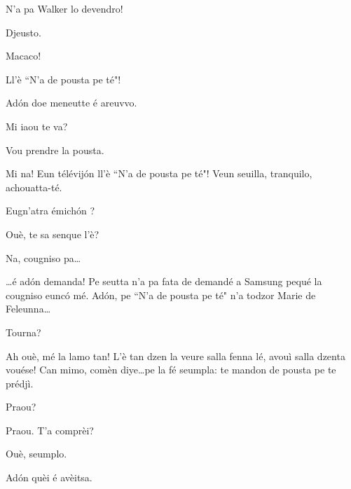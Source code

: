 \begin{drama}
\Vioujspeaks N'a pa Walker lo devendro!

\Vioupspeaks Djeusto.

\Vioujspeaks Macaco!

\Vioupspeaks Ll'è ``N'a de pousta pe té"!


\Vioujspeaks Ad\'on doe meneutte é areuvvo.

\Vioupspeaks Mi iaou te va?

\Vioujspeaks Vou prendre la pousta.

\Vioupspeaks Mi na! Eun télévij\'on ll'è ``N'a de pousta pe té"! Veun seuilla, tranquilo, achouatta-té.


\Vioujspeaks Eugn'atra émich\'on ?

\Vioupspeaks Ouè, te sa senque l'è?

\Vioujspeaks Na, cougniso pa\ldots

\Vioupspeaks \ldots é ad\'on demanda! Pe seutta n'a pa fata de demandé a Samsung pequé la cougniso eunc\'o mé. Ad\'on, pe ``N'a de pousta pe té" n'a todzor Marie de Feleunna\ldots

\Vioujspeaks Tourna?

\Vioupspeaks Ah ouè, mé la lamo tan! L'è tan dzen la veure salla fenna lé, avouì salla dzenta vouése! Can mimo, comèn diye\ldots pe la fé seumpla: te mandon de pousta pe te prédjì.

\Vioujspeaks Praou?

\Vioupspeaks Praou. T'a comprèi?

\Vioujspeaks Ouè, seumplo.

\Vioupspeaks Ad\'on quèi é avèitsa.



\scene[-- N'a de pousta pe té]


\label{pousta}
 


\end{drama}
